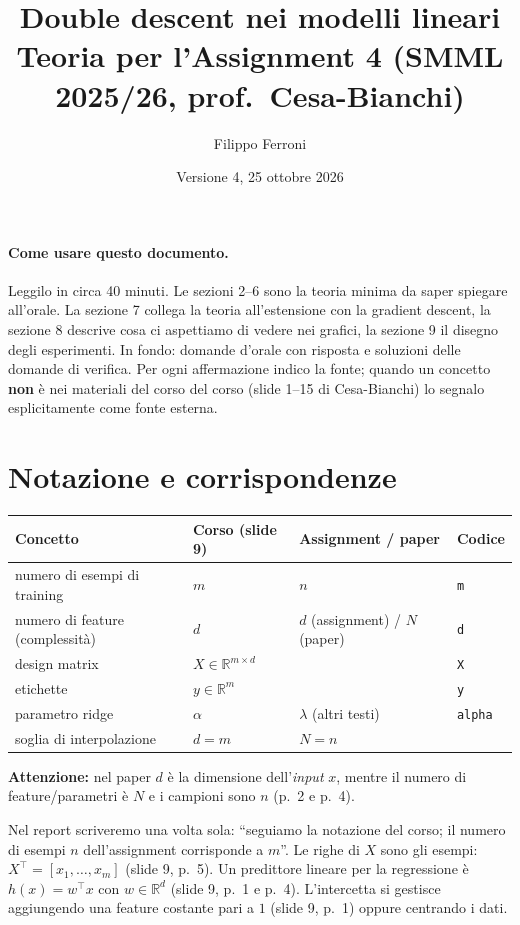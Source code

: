 \documentclass[11pt,a4paper]{article}
\title{Double descent nei modelli lineari\\\large Teoria per l'Assignment 4 (SMML 2025/26, prof.\ Cesa-Bianchi)}
\author{Filippo Ferroni}
\date{Versione 4, 25 ottobre 2026}
\newcommand{\R}{\mathbb{R}}
\begin{document}
\maketitle

\paragraph{Come usare questo documento.}
Leggilo in circa 40 minuti. Le sezioni 2--6 sono la teoria minima da saper spiegare all'orale.
La sezione 7 collega la teoria all'estensione con la gradient descent, la sezione 8 descrive cosa ci aspettiamo
di vedere nei grafici, la sezione 9 il disegno degli esperimenti. In fondo: domande d'orale con risposta e soluzioni
delle domande di verifica. Per ogni affermazione indico la fonte; quando un concetto \textbf{non} è nei materiali del corso
del corso (slide 1--15 di Cesa-Bianchi) lo segnalo esplicitamente come fonte esterna.

\tableofcontents

\section{Notazione e corrispondenze}

\begin{center}
\begin{tabular}{@{}llll@{}}
\toprule
Concetto & Corso (slide 9) & Assignment / paper & Codice \\
\midrule
numero di esempi di training & $m$ & $n$ & \texttt{m} \\
numero di feature (complessità) & $d$ & $d$ (assignment) / $N$ (paper) & \texttt{d} \\
design matrix & $X \in \R^{m\times d}$ & & \texttt{X} \\
etichette & $y \in \R^m$ & & \texttt{y} \\
parametro ridge & $\alpha$ & $\lambda$ (altri testi) & \texttt{alpha} \\
soglia di interpolazione & $d = m$ & $N = n$ & \\
\bottomrule
\end{tabular}
\end{center}

\textbf{Attenzione:} nel paper $d$ è la dimensione dell'\emph{input} $x$, mentre il numero di feature/parametri è $N$ e i campioni sono $n$ (p.~2 e p.~4).

Nel report scriveremo una volta sola: ``seguiamo la notazione del corso; il numero di esempi $n$ dell'assignment
corrisponde a $m$''. Le righe di $X$ sono gli esempi: $X^\top = [x_1,\dots,x_m]$ (slide 9, p.~5).
Un predittore lineare per la regressione è $h(x) = w^\top x$ con $w \in \R^d$ (slide 9, p.~1 e p.~4).
L'intercetta si gestisce aggiungendo una feature costante pari a $1$ (slide 9, p.~1) oppure centrando i dati.
\end{document}
